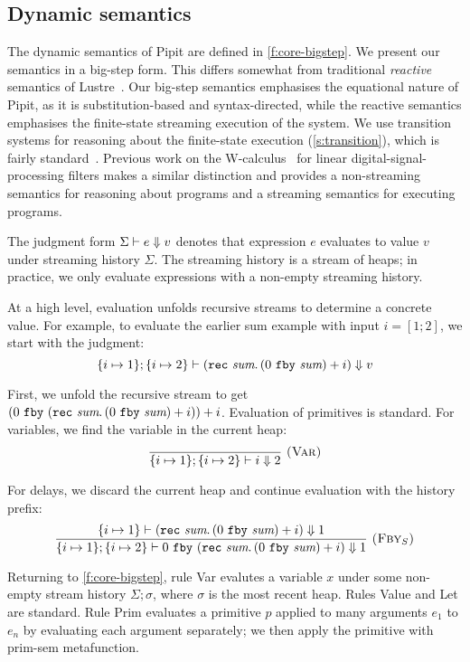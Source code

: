 \subsection{Dynamic semantics}
\label{s:core:dynamic}


The dynamic semantics of Pipit are defined in \autoref{f:core-bigstep}.
We present our semantics in a big-step form.
This differs somewhat from traditional \emph{reactive} semantics of Lustre~\cite{caspi1995functional}.
Our big-step semantics emphasises the equational nature of Pipit, as it is substitution-based and syntax-directed, while the reactive semantics emphasises the finite-state streaming execution of the system.
We use transition systems for reasoning about the finite-state execution (\autoref{s:transition}), which is fairly standard~\cite{brun2023equation,champion2016kind2,raymond2008synchronous}.
Previous work on the {\sc W-calculus}~\cite{gallego2021w} for linear digital-signal-processing filters makes a similar distinction and provides a non-streaming semantics for reasoning about programs and a streaming semantics for executing programs.


The judgment form $\Sigma \vdash e \Downarrow v$ denotes that expression $e$ evaluates to value $v$ under streaming history $\Sigma$.
The streaming history is a stream of heaps; in practice, we only evaluate expressions with a non-empty streaming history.

At a high level, evaluation unfolds recursive streams to determine a concrete value.
For example, to evaluate the earlier sum example with input $i = [1; 2]$, we start with the judgment:
$$
\{ i \mapsto 1 \}; \{ i \mapsto 2 \} \vdash (\texttt{rec}~\textit{sum}.\, (0~\texttt{fby}~\textit{sum}) + i) \Downarrow v
$$

First, we unfold the recursive stream to get $(0~\texttt{fby}~(\texttt{rec}~\textit{sum}.\, (0~\texttt{fby}~\textit{sum}) + i)) + i$.
Evaluation of primitives is standard.
For variables, we find the variable in the current heap:
$$
\enskip \frac {\displaystyle 
} {\displaystyle 
  \{ i \mapsto 1 \}; \{ i \mapsto 2 \} \vdash i \Downarrow 2
} \  \textsc{(Var)} \enskip
$$

For delays, we discard the current heap and continue evaluation with the history prefix:
$$
\enskip \frac {\displaystyle 
  \{ i \mapsto 1 \} \vdash (\texttt{rec}~\textit{sum}.\, (0~\texttt{fby}~\textit{sum}) + i) \Downarrow 1
} {\displaystyle 
  \{ i \mapsto 1 \}; \{ i \mapsto 2 \} \vdash 0~\texttt{fby}~(\texttt{rec}~\textit{sum}.\, (0~\texttt{fby}~\textit{sum}) + i) \Downarrow 1
} \  \textsc{($\mbox{Fby}_S$)} \enskip
$$

Returning to \autoref{f:core-bigstep},
rule {\sc Var} evalutes a variable $x$ under some non-empty stream history $\Sigma; \sigma$, where $\sigma$ is the most recent heap.
Rules {\sc Value} and {\sc Let} are standard.
Rule {\sc Prim} evaluates a primitive $p$ applied to many arguments $e_1$ to $e_n$ by evaluating each argument separately; we then apply the primitive with prim-sem metafunction.


